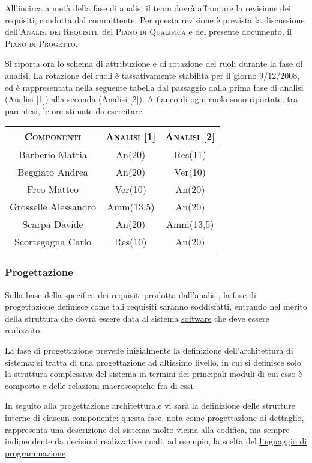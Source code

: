 \documentclass[11pt,a4paper]{article}
\begin{document}
All'incirca a metà della fase di analisi il team dovrà affrontare la revisione dei requisiti, condotta dal committente.
Per questa revisione è prevista la discussione dell'\textsc{Analisi dei Requisiti}, del \textsc{Piano di Qualifica} e del presente documento, il \textsc{Piano di Progetto}.

Si riporta ora lo schema di attribuzione e di rotazione dei ruoli durante la fase di analisi.
La rotazione dei ruoli è tassativamente stabilita per il giorno 9/12/2008, ed è rappresentata nella seguente tabella dal passaggio dalla prima fase di analisi (Analisi [1]) alla seconda (Analisi [2]).
A fianco di ogni ruolo sono riportate, tra parentesi, le ore stimate da esercitare.
\\
\begin{center}
\begin{tabular}{|c||c|c|}
\hline
\textsc{Componenti} & \textsc{Analisi [1]} & \textsc{Analisi [2]} \\ \hline \hline
Barberio Mattia & An(20) & Res(11) \\ \hline
Beggiato Andrea & An(20) & Ver(10) \\ \hline
Freo Matteo & Ver(10) & An(20) \\ \hline
Grosselle Alessandro & Amm(13,5) & An(20) \\ \hline
Scarpa Davide & An(20) & Amm(13,5) \\ \hline
Scortegagna Carlo & Res(10) & An(20) \\ \hline
\end{tabular}
\end{center}
\bigskip
\subsubsection{Progettazione}
Sulla base della specifica dei requisiti prodotta dall'analisi, la fase di progettazione definisce come tali requisiti saranno soddisfatti, entrando nel merito della struttura che dovrà essere data al sistema \underline{software} che deve essere realizzato.

La fase di progettazione prevede inizialmente la definizione dell'architettura di sistema: si tratta di una progettazione ad altissimo livello, in cui si definisce solo la struttura complessiva del sistema in termini dei principali moduli di cui esso è composto e delle relazioni macroscopiche fra di essi.

In seguito alla progettazione architetturale vi sarà la definizione delle strutture interne di ciascun componente: questa fase, nota come progettazione di dettaglio, rappresenta una descrizione del sistema molto vicina alla codifica, ma sempre indipendente da decisioni realizzative quali, ad esempio, la scelta del \underline{linguaggio di programmazione}.
\end{document}
